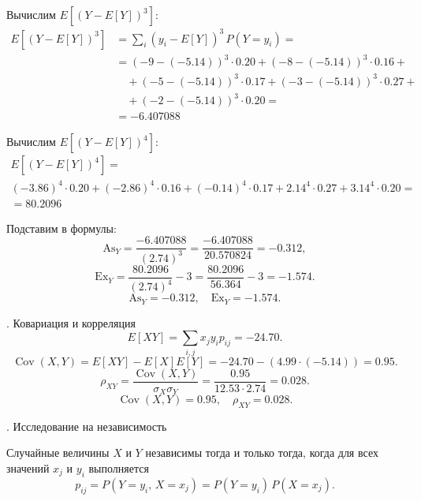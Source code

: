 \documentclass[a4paper,14pt]{extarticle}
\begin{document}
            Вычислим $E[(Y - E[Y])^3]$:
            \[
                \begin{aligned}
                    E[(Y - E[Y])^3] &= \sum_i (y_i - E[Y])^3 \, P(Y=y_i) = \\
                    &= (-9 - (-5.14))^3 \cdot 0.20 + (-8 - (-5.14))^3 \cdot 0.16 + \\
                    &\quad + (-5 - (-5.14))^3 \cdot 0.17 + (-3 - (-5.14))^3 \cdot 0.27 + \\
                    &\quad + (-2 - (-5.14))^3 \cdot 0.20 = \\
                    & = -6.407088
                \end{aligned}
            \]
            
            Вычислим $E[(Y - E[Y])^4]$:
            \begin{gather*}
                E[(Y - E[Y])^4] = \\
                (-3.86)^4 \cdot 0.20 + (-2.86)^4 \cdot 0.16 + (-0.14)^4 \cdot 0.17 + 2.14^4 \cdot 0.27 + 3.14^4 \cdot 0.20 = \\
                = 80.2096
            \end{gather*}
            
            Подставим в формулы:
            \[
                \mathrm{As}_Y = \frac{-6.407088}{(2.74)^3} = \frac{-6.407088}{20.570824} = -0.312,
            \]
            \[
                \mathrm{Ex}_Y = \frac{ 80.2096}{(2.74)^4} - 3 = \frac{ 80.2096}{56.364} - 3 = -1.574.
            \]
            \[
                \boxed{\mathrm{As}_Y = -0.312, \quad \mathrm{Ex}_Y = -1.574.}
            \]
            
            . Ковариация и корреляция
            \[
                E[XY] = \sum_{i,j} x_j y_i p_{ij} = -24.70.
            \]
            \[
                \operatorname{Cov}(X,Y) = E[XY] - E[X]E[Y] = -24.70 - (4.99 \cdot (-5.14)) = 0.95.
            \]
            \[
                \rho_{XY} = \frac{\operatorname{Cov}(X,Y)}{\sigma_X \sigma_Y} = \frac{0.95}{12.53 \cdot 2.74} = 0.028.
            \]
            \[
                \boxed{\operatorname{Cov}(X,Y) = 0.95, \quad \rho_{XY} = 0.028.}
            \]
            
            . Исследование на независимость
            
            Случайные величины $X$ и $Y$ независимы тогда и только тогда, когда для всех значений $x_j$ и $y_i$ выполняется
            \[
                p_{ij}=P(Y=y_i,\,X=x_j)=P(Y=y_i)\,P(X=x_j).
            \]
            
\end{document}
